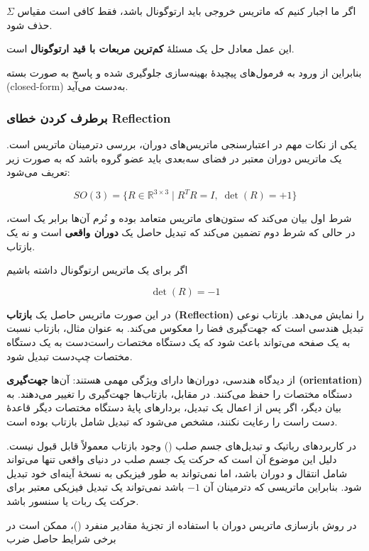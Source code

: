 \documentclass{article}
\begin{document}
اگر ما اجبار کنیم که ماتریس خروجی باید ارتوگونال باشد،
فقط کافی است مقیاس $\Sigma$ حذف شود.

این عمل معادل حل یک مسئلهٔ \textbf{کم‌ترین مربعات با قید ارتوگونال} است.

بنابراین از ورود به فرمول‌های پیچیدهٔ بهینه‌سازی جلوگیری شده و پاسخ به صورت بسته (closed-form) به‌دست می‌آید.


\subsubsection{برطرف کردن خطای Reflection}


یکی از نکات مهم در اعتبارسنجی ماتریس‌های دوران، بررسی دترمینان ماتریس است.
یک ماتریس دوران معتبر در فضای سه‌بعدی باید عضو گروه  باشد که به صورت زیر تعریف می‌شود:

\[
SO(3)=\{R \in \mathbb{R}^{3\times3} \mid R^TR = I,\; \det(R)=+1 \}
\]

شرط اول بیان می‌کند که ستون‌های ماتریس متعامد بوده و نُرم آن‌ها برابر یک است، در حالی که شرط دوم تضمین می‌کند که تبدیل حاصل یک \textbf{دوران واقعی} است و نه یک بازتاب.

اگر برای یک ماتریس ارتوگونال داشته باشیم

\[
\det(R) = -1
\]

در این صورت ماتریس حاصل یک \textbf{بازتاب (Reflection)} را نمایش می‌دهد.
بازتاب نوعی تبدیل هندسی است که جهت‌گیری فضا را معکوس می‌کند. به عنوان مثال، بازتاب نسبت به یک صفحه می‌تواند باعث شود که یک دستگاه مختصات راست‌دست به یک دستگاه مختصات چپ‌دست تبدیل شود.

از دیدگاه هندسی، دوران‌ها دارای ویژگی مهمی هستند: آن‌ها \textbf{جهت‌گیری (orientation)} دستگاه مختصات را حفظ می‌کنند. در مقابل، بازتاب‌ها جهت‌گیری را تغییر می‌دهند. به بیان دیگر، اگر پس از اعمال یک تبدیل، بردارهای پایهٔ دستگاه مختصات دیگر قاعدهٔ دست راست را رعایت نکنند، مشخص می‌شود که تبدیل شامل بازتاب بوده است.

در کاربردهای رباتیک و تبدیل‌های جسم صلب () وجود بازتاب معمولاً قابل قبول نیست. دلیل این موضوع آن است که حرکت یک جسم صلب در دنیای واقعی تنها می‌تواند شامل انتقال و دوران باشد، اما نمی‌تواند به طور فیزیکی به نسخهٔ آینه‌ای خود تبدیل شود. بنابراین ماتریسی که دترمینان آن $-1$ باشد نمی‌تواند یک تبدیل فیزیکی معتبر برای حرکت یک ربات یا سنسور باشد.

در روش بازسازی ماتریس دوران با استفاده از تجزیهٔ مقادیر منفرد ()، ممکن است در برخی شرایط حاصل ضرب
\end{document}
